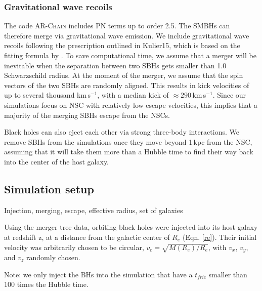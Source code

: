 \documentclass[english, apj]{emulateapj}
\begin{document}
\subsubsection{Gravitational wave recoils}
The code \textsc{AR-Chain} includes PN terms up to order 2.5. The SMBHs can therefore merge via gravitational wave emission. We include gravitational wave recoils following the prescription outlined in Kulier15, which is based on the fitting formula by \citet{2012PhRvD..85h4015L}. To save computational time, we assume that a merger will be inevitable when the separation between two SBHs gets smaller than 1.0 Schwarzschild radius. At the moment of the merger, we assume that the spin vectors of the two SBHs are randomly aligned. This results in kick velocities of up to several thousand km\,s$^{-1}$, with a median kick of $\approx 290$\,km\,s$^{-1}$. Since our simulations focus on NSC with relatively low escape velocities, this implies that a majority of the merging SBHs escape from the NSCs. 

Black holes can also eject each other via strong three-body interactions. We remove SBHs from the simulations once they move beyond 1\,kpc from the NSC, assuming that it will take them more than a Hubble time to find their way back into the center of the host galaxy.


\subsection{Simulation setup}
Injection, merging, escape, effective radius, set of galaxies

Using the merger tree data, orbiting black holes were injected into its host galaxy at redshift z, at a distance from the galactic center of $R_{e}$ (Eqn. \ref{re}).  Their initial velocity was arbitrarily chosen to be circular, $v_c = \sqrt{M(R_e)/R_e}$, with $v_x$, $v_y$, and $v_z$ randomly chosen.

Note: we only inject the BHs into the simulation that have a $t_{fric}$ smaller than 100 times the Hubble time.
\end{document}
